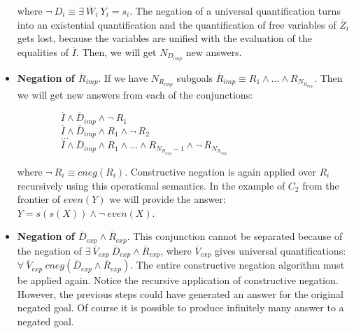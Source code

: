 \documentclass{tlp}
\begin{document}
\begin{itemize}
           where $ \neg~ D_i \equiv \exists~
           \overline{W}_i~ Y_i = s_i$. The negation of a universal
           quantification turns into an existential quantification and
           the quantification of free variables of $\overline{Z}_i$
           gets lost, because the variables are unified with the evaluation of
           the equalities of $\overline{I}$. Then, we will get
           $N_{D_{imp}}$ new answers.


           \item {\bf Negation of $\overline{R}_{imp}$}. If we have
           $N_{R_{imp}}$ subgoals $\overline{R}_{imp} \equiv R_1
           \wedge \ldots \wedge R_{N_{R_{imp}}}$. Then we will get
           new answers from each of the conjunctions: 

           $~~~~~~~~~~~~~~~~~~~~\overline{I} \wedge \overline{D}_{imp} \wedge \neg~ R_1 $ \\ 
           $~~~~~~~~~~~~~~~~~~~~\overline{I} \wedge \overline{D}_{imp} \wedge
           R_1 \wedge \neg~ R_2 $ \\ 
           $~~~~~~~~~~~~~~~~~~~~\ldots $ \\ 
           $~~~~~~~~~~~~~~~~~~~~\overline{I} \wedge \overline{D}_{imp} \wedge
           R_1 \wedge \ldots \wedge R_{N_{R_{imp}}-1} \wedge \neg~
           R_{N_{R_{imp}}}$ 

           where $ \neg~ R_i \equiv cneg(R_i)$. Constructive negation is again
           applied over $R_i$ recursively using this operational semantics.
           In the example of $C_2$ from the frontier of $even(Y)$ we will
           provide the answer: $Y = s(s(X)) \wedge \neg~even(X)$.

           \item {\bf Negation of $\overline{D}_{exp} \wedge
           \overline{R}_{exp}$}. This conjunction cannot be separated
           because of the negation of $ \exists~ \overline{V}_{exp}~
           \overline{D}_{exp} \wedge \overline{R}_{exp}$, where
           $\overline{V}_{exp}$ gives universal quantifications:\\
           $\forall~ \overline{V}_{exp}~ cneg(\overline{D}_{exp}
           \wedge \overline{R}_{exp})$. The entire constructive
           negation algorithm must be applied again. Notice the
           recursive application of constructive negation. However,
           the previous steps could have generated an answer for the
           original negated goal. Of course it is possible to produce
           infinitely many answer to a negated goal.


\end{itemize}
\end{document}
